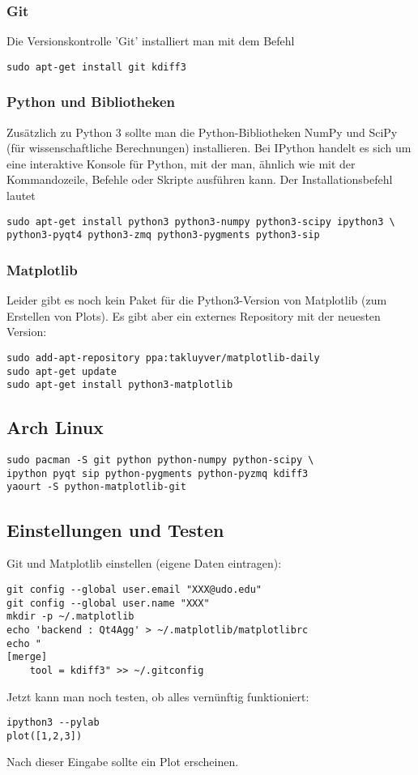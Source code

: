 \subsubsection{Git}
Die Versionskontrolle 'Git' installiert man mit dem Befehl
\begin{verbatim}
sudo apt-get install git kdiff3
\end{verbatim}

\subsubsection{Python und Bibliotheken}
Zusätzlich zu Python 3 sollte man die Python-Bibliotheken NumPy und SciPy (für wissenschaftliche Berechnungen) installieren.
Bei IPython handelt es sich um eine interaktive Konsole für Python, mit der man, ähnlich wie mit der Kommandozeile, Befehle oder Skripte ausführen kann.
Der Installationsbefehl lautet
\begin{verbatim}
sudo apt-get install python3 python3-numpy python3-scipy ipython3 \
python3-pyqt4 python3-zmq python3-pygments python3-sip
\end{verbatim}

\subsubsection{Matplotlib}
Leider gibt es noch kein Paket für die Python3-Version von Matplotlib (zum Erstellen von Plots).
Es gibt aber ein externes Repository mit der neuesten Version:
\begin{verbatim}
sudo add-apt-repository ppa:takluyver/matplotlib-daily
sudo apt-get update
sudo apt-get install python3-matplotlib
\end{verbatim}

\subsection{Arch Linux}
\begin{verbatim}
sudo pacman -S git python python-numpy python-scipy \
ipython pyqt sip python-pygments python-pyzmq kdiff3
yaourt -S python-matplotlib-git
\end{verbatim}

\subsection{Einstellungen und Testen}
\label{install-test}
Git und Matplotlib einstellen (eigene Daten eintragen):
\begin{verbatim}
git config --global user.email "XXX@udo.edu"
git config --global user.name "XXX"
mkdir -p ~/.matplotlib
echo 'backend : Qt4Agg' > ~/.matplotlib/matplotlibrc
echo "
[merge]
    tool = kdiff3" >> ~/.gitconfig
\end{verbatim}
Jetzt kann man noch testen, ob alles vernünftig funktioniert:
\begin{verbatim}
ipython3 --pylab
plot([1,2,3])
\end{verbatim}
Nach dieser Eingabe sollte ein Plot erscheinen.
